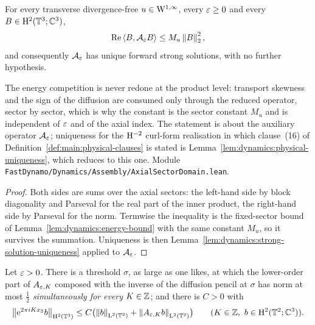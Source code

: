 \begin{lemma}
  \label{lem:dynamics:product-dissipative}
  \leanok
  For every transverse divergence-free $u\in\mathrm{W}^{1,\infty} $, every $\varepsilon\geq0 $ and every
  $B\in\mathrm{H}^2(\mathbb{T}^3;\mathbb{C}^3) $,
  \[
    \operatorname{Re}\left\langle B,\mathcal A_\varepsilon B\right\rangle\leq M_u\left\|B\right\|_2^2 ,
  \]
  and consequently $\mathcal A_\varepsilon $ has unique forward strong solutions, with no further
  hypothesis.
\end{lemma}

The energy competition is never redone at the product level: transport skewness and the sign
of the diffusion are consumed only through the reduced operator, sector by sector, which is
why the constant is the sector constant $M_u $ and is independent of $\varepsilon $ and of the axial
index.  The statement is about the auxiliary operator $\mathcal A_\varepsilon $; uniqueness for the
$\mathrm{H}^{-2}$ curl-form realisation in which clause~(16) of
Definition~\ref{def:main:physical-clauses} is stated is
Lemma~\ref{lem:dynamics:physical-uniqueness}, which reduces to this one.  Module
\texttt{FastDynamo/Dynamics/Assembly/AxialSectorDomain.lean}.

\begin{proof}
  \leanok
  Both sides are sums over the axial sectors: the left-hand side by block diagonality and
  Parseval for the real part of the inner product, the right-hand side by Parseval for the
  norm.  Termwise the inequality is the fixed-sector bound of
  Lemma~\ref{lem:dynamics:energy-bound} with the same constant $M_u $, so it survives the
  summation.  Uniqueness is then
  Lemma~\ref{lem:dynamics:strong-solution-uniqueness} applied to $\mathcal A_\varepsilon $.
\end{proof}

\begin{lemma}
  \label{lem:dynamics:uniform-sector-estimate}
  \leanok
  Let $\varepsilon>0 $.  There is a threshold $\sigma $, as large as one likes, at which the
  lower-order part of $A_{\varepsilon,K} $ composed with the inverse of the diffusion pencil at
  $\sigma $ has norm at most $\tfrac12 $ \emph{simultaneously for every} $K\in\mathbb{Z} $; and there
  is $C>0 $ with
  \[
    \left\|\mathrm{e}^{2\pi iKx_3}b\right\|_{\mathrm{H}^2(\mathbb{T}^3)}
    \leq C\bigl(\left\|b\right\|_{\mathrm{L}^2(\mathbb{T}^2)}+\left\|A_{\varepsilon,K}b\right\|_{\mathrm{L}^2(\mathbb{T}^2)}\bigr)
    \qquad(K\in\mathbb{Z},\ b\in\mathrm{H}^2(\mathbb{T}^2;\mathbb{C}^3)).
  \]
\end{lemma}

